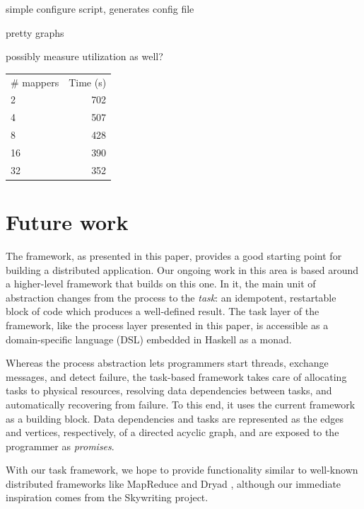 \documentclass[preprint]{sigplanconf}
\begin{document}
simple configure script, generates config file

pretty graphs

possibly measure utilization as well?

\begin{center}
\begin{table}[h]

\begin{tabular}{l r}
\hline
  \# mappers & Time (s) \\
  2 & 702 \\
  4 & 507 \\
  8 & 428 \\
  16 & 390 \\
  32 & 352 \\
\hline
\end{tabular}
\end{table}
\end{center}


\section{Future work}
\label{s:futureWork}
The framework, as presented in this paper, provides a good starting point for building a distributed application. Our ongoing work in this area is based around a higher-level framework that builds on this one. In it, the main unit of abstraction changes from the process to the {\em task}: an idempotent, restartable block of code which produces a well-defined result. The task layer of the framework, like the process layer presented in this paper, is accessible as a domain-specific language (DSL) embedded in Haskell as a monad.

Whereas the process abstraction lets programmers start threads, exchange messages, and detect failure, the task-based framework takes care of allocating tasks to physical resources, resolving data dependencies between tasks, and automatically recovering from failure. To this end, it uses the current framework as a building block. Data dependencies and tasks are represented as the edges and vertices, respectively, of a directed acyclic graph, and are exposed to the programmer as {\em promises}.

With our task framework, we hope to provide functionality similar to well-known distributed frameworks like MapReduce \cite{MapReduce2008} and Dryad \cite{Dryad2007}, although our immediate inspiration comes from the Skywriting \cite{Murray2010}\cite{Murray2011} project.
\end{document}
